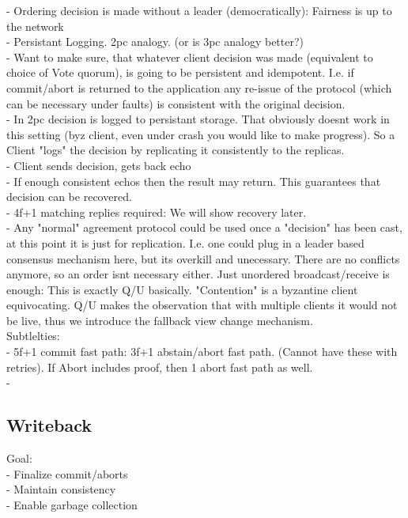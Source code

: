 - Ordering decision is made without a leader (democratically): Fairness is up to the network\\
	
- Persistant Logging. 2pc analogy. (or is 3pc analogy better?)\\
	- Want to make sure, that whatever client decision was made (equivalent to choice of Vote quorum), is going to be persistent and idempotent. I.e. if commit/abort is returned to the application any re-issue of the protocol (which can be necessary under faults) is consistent with the original decision.\\
	- In 2pc decision is logged to persistant storage. That obviously doesnt work in this setting (byz client, even under crash you would like to make progress). So a Client "logs" the decision by replicating it consistently to the replicas.\\
	- Client sends decision, gets back echo\\
	- If enough consistent echos then the result may return. This guarantees that decision can be recovered.\\
	- 4f+1 matching replies required: We will show recovery later.\\
	
- Any "normal" agreement protocol could be used once a "decision" has been cast, at this point it is just for replication. I.e. one could plug in a leader based consensus mechanism here, but its overkill and unecessary. There are no conflicts anymore, so an order isnt necessary either. Just unordered broadcast/receive is enough: This is exactly Q/U basically. "Contention" is a byzantine client equivocating. Q/U makes the observation that with multiple clients it would not be live, thus we introduce the fallback view change mechanism. \\

Subtlelties:\\
- 5f+1 commit fast path: 3f+1 abstain/abort fast path. (Cannot have these with retries). If Abort includes proof, then 1 abort fast path as well.\\
- 


\subsection{Writeback}
Goal: \\
- Finalize commit/aborts\\
- Maintain consistency\\
- Enable garbage collection\\

